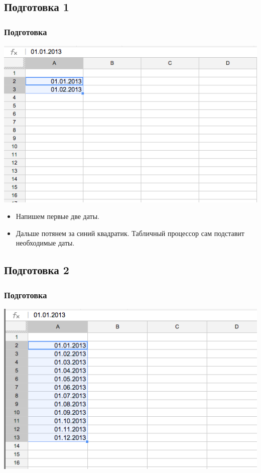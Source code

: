 \documentclass[compress,red]{beamer}
\begin{document}
\subsection{Подготовка 1}
\begin{frame}[fragile]
  \frametitle{Подготовка}
  \centerline{\includegraphics[width=1.0\textwidth]{images/12.png}}
  \begin{itemize}
    \item Напишем первые две даты.
    \item Дальше потянем за синий квадратик. Табличный процессор сам подставит необходимые даты.
  \end{itemize}
\end{frame}

\subsection{Подготовка 2}
\begin{frame}[fragile]
  \frametitle{Подготовка}
  \centerline{\includegraphics[width=1.0\textwidth]{images/13.png}}
\end{frame}
\end{document}
